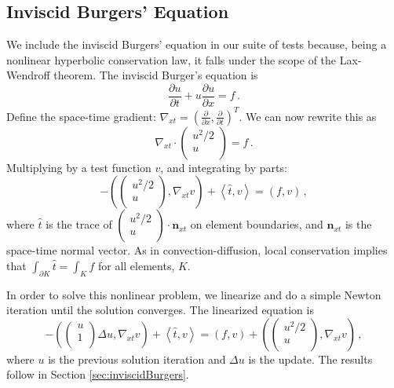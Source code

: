 \documentclass[letterpaper]{article}
\newcommand{\LRp}[1]{\left( #1 \right)}
\newcommand{\LRa}[1]{\left\langle #1 \right\rangle}
\newcommand{\Grad} {\ensuremath{\nabla}}
\def\vecttwo#1#2{\left(
\begin{array}{c}
#1\\
#2\\
\end{array}
\right)}
\begin{document}
\subsection{Inviscid Burgers' Equation}
We include the inviscid Burgers' equation in our suite of tests because, being
a nonlinear hyperbolic conservation law, it
falls under the scope of the Lax-Wendroff theorem. %
The inviscid Burger's equation is
\[
\frac{\partial u}{\partial t}+u\frac{\partial u}{\partial x}=f\,.
\]
Define the space-time gradient: $\Grad_{xt}=\LRp{\frac{\partial}{\partial
x},\frac{\partial}{\partial t}}^T$. We can now rewrite this as
\[
\Grad_{xt}\cdot\vecttwo{u^2/2}{u}=f\,.
\]
Multiplying by a test function $v$, and integrating by parts:
\[
-\LRp{\vecttwo{u^2/2}{u},\Grad_{xt}v}+\LRa{\hat t,v}=\LRp{f,v}\,,
\]
where $\hat t$ is the trace of $\vecttwo{u^2/2}{u}\cdot\mathbf{n}_{xt}$ on
element boundaries, and $\mathbf{n}_{xt}$ is the space-time normal vector.
As in convection-diffusion, local conservation implies that
$\int_{\partial K}\hat t=\int_Kf$ for all elements, $K$.

In order to solve this nonlinear problem, we linearize and do a simple Newton iteration
until the solution converges. The linearized equation is
\[
-\LRp{\vecttwo{u}{1}\Delta u,\Grad_{xt}v}+\LRa{\hat t,v}=\LRp{f,v}
+\LRp{\vecttwo{u^2/2}{u},\Grad_{xt}v} \,,
\]
where $u$ is the previous solution iteration and $\Delta u$ is the update.
The results follow in Section \ref{sec:inviscidBurgers}.
\end{document}
